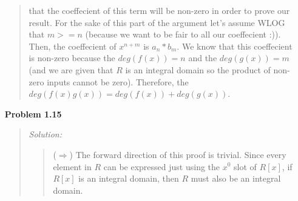 \documentclass{article}
\newcommand{\Solution}{\textit{Solution: }}
\begin{document}
\begin{enumerate}
\begin{quote}
                that the coeffecient of this term will be non-zero in order to prove our result. For the sake of this part of the argument
                let's assume WLOG that $m >= n$ (because we want to be fair to all our coeffecient :)). Then, the coeffecient of $x^{n+m}$
                is $a_n*b_m$. We know that this coeffecient is non-zero because the $deg(f(x)) = n$ and the $deg(g(x)) = m$ (and we are given
                that $R$ is an integral domain so the product of non-zero inputs cannot be zero). Therefore, the $deg(f(x)g(x)) = deg(f(x)) + deg(g(x))$.
                \qedsymbol
            \end{quote}
        \item[\textbf{Problem 1.15}]
            \begin{quote}
                \Solution

                \begin{quote}
                    ($\Rightarrow$) The forward direction of this proof is trivial. Since every element in $R$ can be expressed just using
                    the $x^0$ slot of $R[x]$, if $R[x]$ is an integral domain, then $R$ must also be an integral domain.
                \end{quote}
                    

\end{quote}
\end{enumerate}
\end{document}

